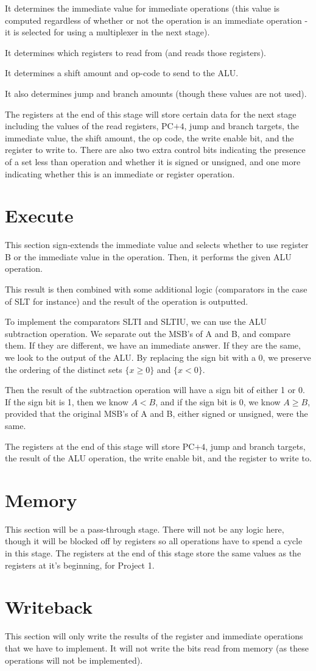 \documentclass{article}
\begin{document}
It determines the immediate value for immediate operations (this value is computed regardless of whether or not the operation is an immediate operation - it is selected for using a multiplexer in the next stage).

It determines which registers to read from (and reads those registers).

It determines a shift amount and op-code to send to the ALU.

It also determines jump and branch amounts (though these values are not used).

The registers at the end of this stage will store certain data for the next stage including the values of the read registers, PC$+4$, jump and branch targets, the immediate value, the shift amount, the op code, the write enable bit, and the register to write to. There are also two extra control bits indicating the presence of a set less than operation and whether it is signed or unsigned, and one more indicating whether this is an immediate or register operation. 

\section*{Execute}
This section sign-extends the immediate value and selects whether to use register B or the immediate value in the operation.  Then, it performs the given ALU operation.

This result is then combined with some additional logic (comparators in the case of SLT for instance) and the result of the operation is outputted.

To implement the comparators SLTI and SLTIU, we can use the ALU subtraction operation. We separate out the MSB's of A and B, and compare them. If they are different, we have an immediate answer. If they are the same, we look to the output of the ALU. By replacing the sign bit with a 0, we preserve the ordering of the distinct sets $\{x \geq 0\}$ and $\{x < 0\}$. 

Then the result of the subtraction operation will have a sign bit of either 1 or 0. If the sign bit is 1, then we know $A < B$, and if the sign bit is 0, we know $A \geq B$, provided that the original MSB's of A and B, either signed or unsigned, were the same. 

The registers at the end of this stage will store PC$+4$, jump and branch targets, the result of the ALU operation, the write enable bit, and the register to write to.

\section*{Memory}
This section will be a pass-through stage. There will not be any logic here, though it will be blocked off by registers so all operations have to spend a cycle in this stage. The registers at the end of this stage store the same values as the registers at it's beginning, for Project 1. 

\section*{Writeback}
This section will only write the results of the register and immediate operations that we have to implement.  It will not write the bits read from memory (as these operations will not be implemented).
\end{document}
